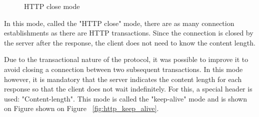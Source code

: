 \begin{figure}[p]
  \centering
  \caption{HTTP close mode}
  \label{fig:http_close}
\end{figure}

In this mode, called the "HTTP close" mode, there are as many connection
establishments as there are HTTP transactions. Since the connection is closed
by the server after the response, the client does not need to know the content
length.

Due to the transactional nature of the protocol, it was possible to improve it
to avoid closing a connection between two subsequent transactions. In this mode
however, it is mandatory that the server indicates the content length for each
response so that the client does not wait indefinitely. For this, a special
header is used: "Content-length". This mode is called the "keep-alive" mode
and is shown on Figure shown on Figure ~\ref{fig:http_keep_alive}.

